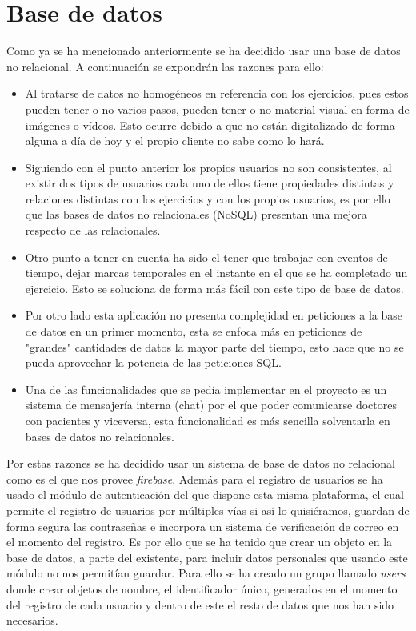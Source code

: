 \section{Base de datos}
Como ya se ha mencionado anteriormente se ha decidido usar una base
de datos no relacional. A continuación se expondrán las razones
para ello:

\begin{itemize}
    \item Al tratarse de datos no homogéneos en referencia con los
    ejercicios, pues estos pueden tener o no varios pasos, pueden
    tener o no material visual en forma de imágenes o vídeos. Esto
    ocurre debido a que no están digitalizado de forma alguna a día
    de hoy y el propio cliente no sabe como lo hará.
    \item Siguiendo con el punto anterior los propios usuarios
    no son consistentes, al existir dos tipos de usuarios cada
    uno de ellos tiene propiedades distintas y relaciones distintas
    con los ejercicios y con los propios usuarios, es por ello que
    las bases de datos no relacionales (NoSQL) presentan una mejora
    respecto de las relacionales.
    \item Otro punto a tener en cuenta ha sido el tener que trabajar
    con eventos de tiempo, dejar marcas temporales en el instante en
    el que se ha completado un ejercicio. Esto se soluciona de forma
    más fácil con este tipo de base de datos.
    \item Por otro lado esta aplicación no presenta complejidad en
    peticiones a la base de datos en un primer momento, esta se
    enfoca más en peticiones de "grandes" cantidades de datos la
    mayor parte del tiempo, esto hace que no se pueda aprovechar la
    potencia de las peticiones SQL\cite{sql}.
    \item Una de las funcionalidades que se pedía implementar en el
    proyecto es un sistema de mensajería interna (chat) por el que
    poder comunicarse doctores con pacientes y viceversa, esta
    funcionalidad es más sencilla solventarla en bases de datos no
    relacionales.
\end{itemize}

\medskip
Por estas razones se ha decidido usar un sistema de base de datos
no relacional como es el que nos provee \textit{firebase}. Además
para el registro de usuarios se ha usado el módulo de autenticación
del que dispone esta misma plataforma, el cual permite el registro
de usuarios por múltiples vías si así lo quisiéramos, guardan de
forma segura las contraseñas e incorpora un sistema de verificación
de correo en el momento del registro. Es por ello que se ha tenido
que crear un objeto en la base de datos, a parte del existente,
para incluir datos personales que usando este módulo no nos permitían
guardar. Para ello se ha creado un grupo llamado \textit{users} donde
crear objetos de nombre, el identificador único, generados en el
momento del registro de cada usuario y dentro de este el resto de
datos que nos han sido necesarios.

